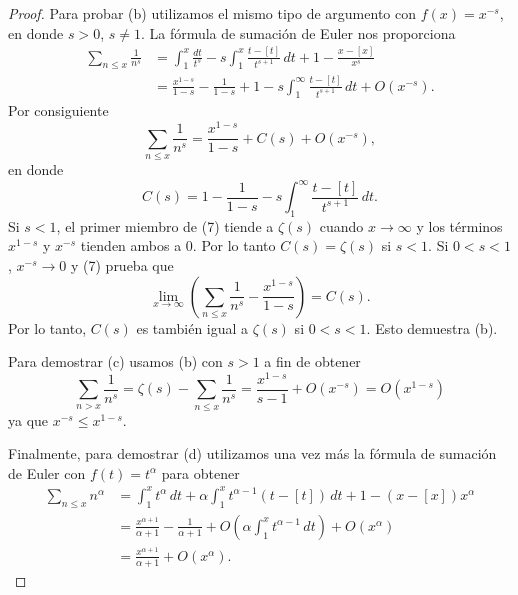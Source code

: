 \documentclass[12pt,a4paper]{book}
\begin{document}
\begin{proof}
        Para probar (b) utilizamos el mismo tipo de argumento con $f(x)=x^{-s}$, en donde
        $s>0$, $s\neq1$. La fórmula de sumación de Euler nos proporciona
        \begin{align*}
            \sum_{n\leq x}\frac{1}{n^{s}}&=\int_{1}^{x}\frac{dt}{t^{s}}-s\int_{1}^{x}\frac{t-[t]}{t^{s+1}}\,dt
            +1-\frac{x-[x]}{x^{s}}\\
            &=\frac{x^{1-s}}{1-s}-\frac{1}{1-s}+1-s\int_{1}^{\infty}\frac{t-[t]}{t^{s+1}}\,dt+O(x^{-s}).
        \end{align*}
        Por consiguiente
        \begin{equation}
            \sum_{n\leq x}\frac{1}{n^{s}}=\frac{x^{1-s}}{1-s}+C(s)+O(x^{-s}),
        \end{equation}
        en donde
        \begin{equation*}
            C(s)=1-\frac{1}{1-s}-s\int_{1}^{\infty}\frac{t-[t]}{t^{s+1}}\,dt.
        \end{equation*}
        Si $s<1$, el primer miembro de (7) tiende a $\zeta(s)$ cuando $x\to\infty$ y los
        términos $x^{1-s}$ y $x^{-s}$ tienden ambos a 0. Por lo tanto $C(s)=\zeta(s)$ si
        $s<1$. Si $0<s<1$, $x^{-s}\to0$ y (7) prueba que
        \begin{equation*}
            \lim_{x\to\infty}\left(\sum_{n\leq x}\frac{1}{n^{s}}-\frac{x^{1-s}}{1-s}\right)=C(s).
        \end{equation*}
        Por lo tanto, $C(s)$ es también igual a $\zeta(s)$ si $0<s<1$. Esto demuestra (b).

        Para demostrar (c) usamos (b) con $s>1$ a fin de obtener
        \begin{equation*}
            \sum_{n>x}\frac{1}{n^{s}}=\zeta(s)-\sum_{n\leq x}\frac{1}{n^{s}}=\frac{x^{1-s}}{s-1}+O(x^{-s})
            =O(x^{1-s})
        \end{equation*}
        ya que $x^{-s}\leq x^{1-s}$.

        Finalmente, para demostrar (d) utilizamos una vez más la fórmula de sumación de
        Euler con $f(t)=t^{\alpha}$ para obtener
        \begin{align*}
            \sum_{n\leq x}n^{\alpha}&=\int_{1}^{x} t^{\alpha}\,dt+\alpha\int_{1}^{x} t^{\alpha-1}(t-[t])\,dt
            +1-(x-[x])x^{\alpha}\\
            &=\frac{x^{\alpha+1}}{\alpha+1}-\frac{1}{\alpha+1}+O\left(\alpha\int_{1}^{x} t^{\alpha-1}\,dt\right)
            +O(x^{\alpha})\\
            &=\frac{x^{\alpha+1}}{\alpha+1}+O(x^{\alpha}).
        \end{align*}
    \end{proof}
\end{document}
